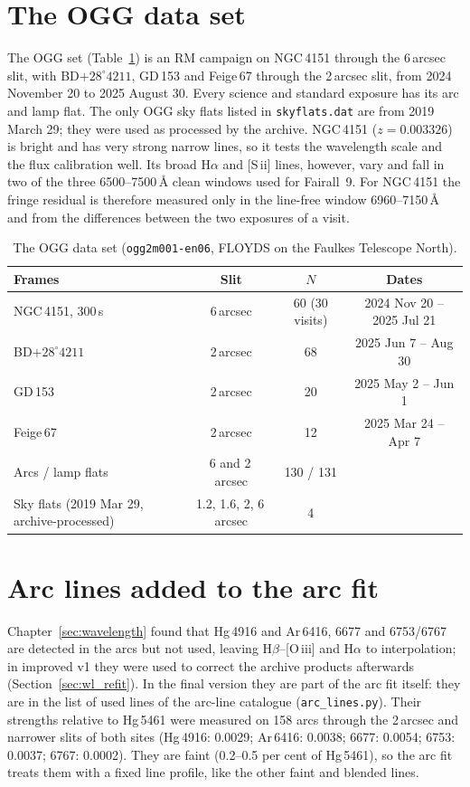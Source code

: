 \section{The OGG data set}
\label{sec:sites_data}
The OGG set (Table~\ref{tab:oggdata}) is an RM campaign on NGC\,4151 through the 6\,arcsec slit, with BD$+28^\circ4211$,
GD\,153 and Feige\,67 through the 2\,arcsec slit, from 2024 November 20 to 2025 August 30. Every science and standard
exposure has its arc and lamp flat. The only OGG sky flats listed in \texttt{skyflats.dat} are from 2019 March 29;
they were used as processed by the archive. NGC\,4151 ($z=0.003326$) is bright and has very strong narrow lines, so it
tests the wavelength scale and the flux calibration well. Its broad H$\alpha$ and [S\,{\sc ii}] lines, however, vary and
fall in two of the three 6500--7500\,\AA{} clean windows used for Fairall~9. For NGC\,4151 the fringe residual is
therefore measured only in the line-free window 6960--7150\,\AA{} and from the differences between the two exposures
of a visit.

\begin{table}[!htbp]
\centering
\caption{The OGG data set (\texttt{ogg2m001-en06}, FLOYDS on the Faulkes Telescope North).}
\label{tab:oggdata}
\begin{tabular}{lccc}
\toprule
Frames & Slit & $N$ & Dates \\
\midrule
NGC\,4151, 300\,s & 6\,arcsec & 60 (30 visits) & 2024 Nov 20 -- 2025 Jul 21 \\
BD$+28^\circ4211$ & 2\,arcsec & 68 & 2025 Jun 7 -- Aug 30 \\
GD\,153 & 2\,arcsec & 20 & 2025 May 2 -- Jun 1 \\
Feige\,67 & 2\,arcsec & 12 & 2025 Mar 24 -- Apr 7 \\
Arcs / lamp flats & 6 and 2\,arcsec & 130 / 131 & \\
Sky flats (2019 Mar 29, archive-processed) & 1.2, 1.6, 2, 6\,arcsec & 4 & \\
\bottomrule
\end{tabular}
\end{table}

\section{Arc lines added to the arc fit}
\label{sec:sites_arcs}
Chapter~\ref{sec:wavelength} found that Hg\,4916 and Ar\,6416, 6677 and 6753/6767 are detected in the arcs but not used,
leaving H$\beta$--[O\,{\sc iii}] and H$\alpha$ to interpolation; in improved v1 they were used to correct the archive
products afterwards (Section~\ref{sec:wl_refit}). In the final version they are part of the arc fit itself: they are
in the list of used lines of the \banzai{} arc-line catalogue (\texttt{arc\_lines.py}). Their strengths relative to
Hg\,5461 were measured on 158 arcs through the 2\,arcsec and narrower slits of both sites (Hg\,4916: 0.0029;
Ar\,6416: 0.0038; 6677: 0.0054; 6753: 0.0037; 6767: 0.0002). They are faint (0.2--0.5 per cent of Hg\,5461), so the
arc fit treats them with a fixed line profile, like the other faint and blended lines.

